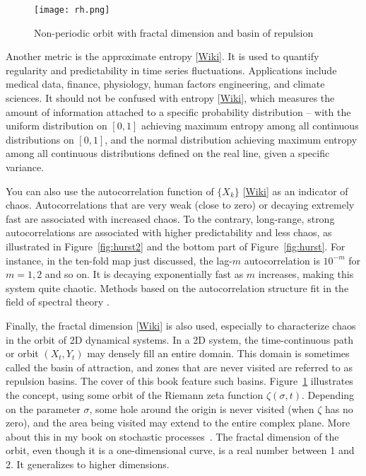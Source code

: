 \documentclass[oneside,10pt]{book}
\begin{document}
\begin{figure}[H]
\centering
\texttt{[image: rh.png]}  %
\caption{Non-periodic orbit with fractal dimension and basin of repulsion}
\label{fig:rheye}
\end{figure}

Another metric is the \textcolor{index}{approximate entropy} [\href{https://en.wikipedia.org/wiki/Approximate_entropy}{Wiki}].
It is used to quantify regularity and predictability in time series fluctuations. Applications include medical data, finance, physiology, human factors engineering, and climate sciences.
It should not be confused with \textcolor{index}{entropy} [\href{https://en.wikipedia.org/wiki/Entropy}{Wiki}], which measures the amount of information attached to a specific probability distribution -- with the uniform distribution on $[0, 1]$ achieving maximum entropy among all continuous distributions on $[0, 1]$, and the normal distribution achieving maximum entropy among all continuous distributions defined on the real line, given a specific variance.



You can also use the \textcolor{index}{autocorrelation function} of $\{X_k\}$ [\href{https://en.wikipedia.org/wiki/Autocorrelation}{Wiki}] as an indicator of chaos. Autocorrelations that are very weak (close to zero) or
 decaying extremely fast are associated with increased chaos. To the contrary, long-range, strong autocorrelations are associated with higher predictability and less chaos, as illustrated in Figure~\ref{fig:hurst2} and the bottom part of Figure~\ref{fig:hurst}.
For instance, in the ten-fold map just discussed, the lag-$m$ autocorrelation is $10^{-m}$ for $m=1,2$ and so on. It is decaying exponentially fast as $m$ increases, making this system quite chaotic.   Methods based on the autocorrelation structure fit in the field of \textcolor{index}{spectral theory} \cite{spectral2020}.

Finally, the \textcolor{index}{fractal dimension} [\href{https://en.wikipedia.org/wiki/Fractal_dimension}{Wiki}] is also used, especially to characterize chaos in the
\textcolor{index}{orbit} of 2D dynamical systems. In a 2D system,
 the time-continuous path or orbit $(X_t, Y_t)$ may densely fill an entire domain. This domain is sometimes called the
\textcolor{index}{basin of attraction}, and zones that are never visited are referred to as
 \textcolor{index}{repulsion basins}. The cover of this book feature such basins.  Figure~\ref{fig:rheye} illustrates
 the concept, using some orbit of the \textcolor{index}{Riemann zeta function} $\zeta(\sigma,t)$. Depending on the parameter $\sigma$, some hole around the origin is never visited (when $\zeta$ has no zero), and the area being visited may extend to the entire complex plane. More about this in my book on stochastic processes~\cite{vgsimulnew}.
 The fractal dimension of the orbit, even though it is a one-dimensional curve, is a real number between 1 and 2. It generalizes to higher dimensions.
\end{document}
